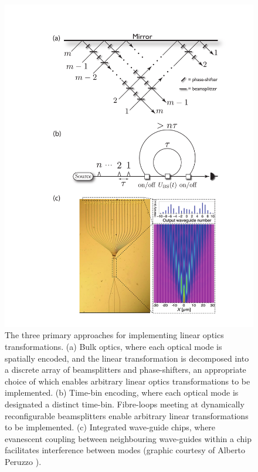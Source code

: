 \documentclass[aps, rmp, twocolumn, amsmath, amssymb, nofootinbib, superscriptaddress, longbibliography, floatfix, table-of-contents, eqsecnum]{revtex4-1}
\begin{document}
\begin{figure}[!htb]
\includegraphics[width=\columnwidth]{LO_archs}
\caption{The three primary approaches for implementing linear optics transformations. (a) Bulk optics, where each optical mode is spatially encoded, and the linear transformation is decomposed into a discrete array of beamsplitters and phase-shifters, an appropriate choice of which enables arbitrary linear optics transformations to be implemented. (b) Time-bin encoding, where each optical mode is designated a distinct time-bin. Fibre-loops meeting at dynamically reconfigurable beamsplitters enable arbitrary linear transformations to be implemented. (c) Integrated wave-guide chips, where evanescent coupling between neighbouring wave-guides within a chip facilitates interference between modes (graphic courtesy of Alberto Peruzzo \cite{bib:PeruzzoQW}).} \label{fig:LO_archs}
\end{figure}
\end{document}
